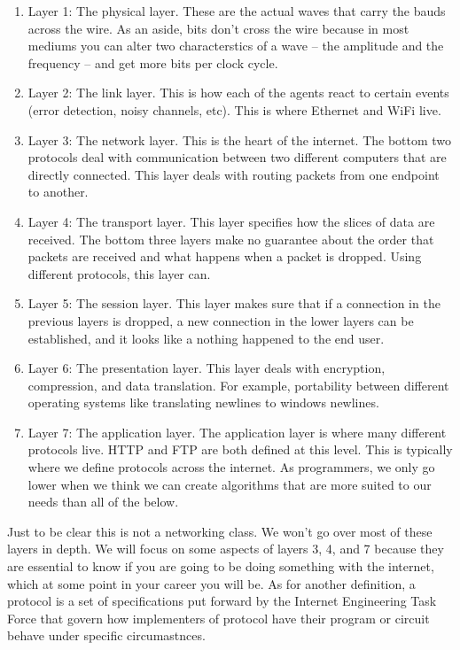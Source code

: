 \documentclass[]{article}
\begin{document}
\begin{enumerate}
\item
  Layer 1: The physical layer. These are the actual waves that carry the
  bauds across the wire. As an aside, bits don't cross the wire because
  in most mediums you can alter two characterstics of a wave -- the
  amplitude and the frequency -- and get more bits per clock cycle.
\item
  Layer 2: The link layer. This is how each of the agents react to
  certain events (error detection, noisy channels, etc). This is where
  Ethernet and WiFi live.
\item
  Layer 3: The network layer. This is the heart of the internet. The
  bottom two protocols deal with communication between two different
  computers that are directly connected. This layer deals with routing
  packets from one endpoint to another.
\item
  Layer 4: The transport layer. This layer specifies how the slices of
  data are received. The bottom three layers make no guarantee about the
  order that packets are received and what happens when a packet is
  dropped. Using different protocols, this layer can.
\item
  Layer 5: The session layer. This layer makes sure that if a connection
  in the previous layers is dropped, a new connection in the lower
  layers can be established, and it looks like a nothing happened to the
  end user.
\item
  Layer 6: The presentation layer. This layer deals with encryption,
  compression, and data translation. For example, portability between
  different operating systems like translating newlines to windows
  newlines.
\item
  Layer 7: The application layer. The application layer is where many
  different protocols live. HTTP and FTP are both defined at this level.
  This is typically where we define protocols across the internet. As
  programmers, we only go lower when we think we can create algorithms
  that are more suited to our needs than all of the below.
\end{enumerate}

Just to be clear this is not a networking class. We won't go over most
of these layers in depth. We will focus on some aspects of layers 3, 4,
and 7 because they are essential to know if you are going to be doing
something with the internet, which at some point in your career you will
be. As for another definition, a protocol is a set of specifications put
forward by the Internet Engineering Task Force that govern how
implementers of protocol have their program or circuit behave under
specific circumastnces.
\end{document}
